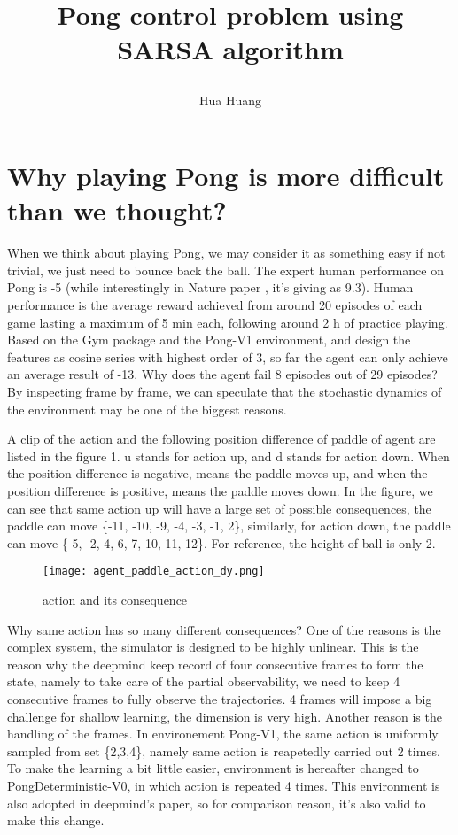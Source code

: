 \documentclass[12pt]{article}
\begin{document}
\title*{\centerline{\huge{Pong control problem using SARSA algorithm}}}
\author*{\centerline{Hua Huang}}%

\section{Why playing Pong is more difficult than we thought?}
When we think about playing Pong, we may consider it as something
easy if not trivial, we just need to bounce back the ball. The expert human performance
on Pong \cite{13atari} is -5 (while interestingly in Nature paper \cite{15atari}, 
it's giving as 9.3). Human performance is the average reward achieved from around 20
episodes of each game lasting a maximum of 5 min each, following around 2 h of practice
playing\cite{15atari}.\\
Based on the Gym package and the Pong\--V1 environment, and design the
features as cosine series with highest order of 3, so far the agent
can only achieve an average result of -13. Why does the agent fail 8
episodes out of 29 episodes? By inspecting frame by frame, we can
speculate that the stochastic dynamics of the environment may be one of the
biggest reasons.

A clip of the action and the following position difference of paddle of agent 
are listed in the figure 1. u stands for action up, and d stands for
action down. When the position difference is negative, means the
paddle moves up, and when the position difference is positive, means
the paddle moves down. In the figure, we can see that same action up
will have a large set of possible consequences, the paddle can move
\{-11, -10, -9, -4, -3, -1, 2\}, similarly, for action down, the paddle
can move \{-5, -2, 4, 6, 7, 10, 11, 12\}. For reference, the height of ball
is only 2.\\
\begin{figure}[h!]
\centering
\texttt{[image: agent\_paddle\_action\_dy.png]}
\caption{action and its consequence}
\end{figure}

Why same action has so many different consequences? One of the reasons
is the complex system, the simulator is designed to be highly
unlinear. This is the reason why the deepmind keep record of four
consecutive frames to form the state, namely to take care of the
partial observability, we need to keep 4 consecutive frames to fully
observe the trajectories. 4 frames will impose a big challenge for
shallow learning, the dimension is very high. Another reason is the 
handling of the frames. In environement Pong\--V1, the same action is 
uniformly sampled from set \{2,3,4\}, namely same action is reapetedly 
carried out 2 times. To make the learning a bit little easier,
environment is hereafter changed to PongDeterministic\--V0, in which action is
repeated 4 times. This environment is also adopted in deepmind's
paper, so for comparison reason, it's also valid to make this change.
\end{document}
